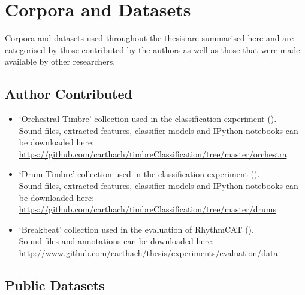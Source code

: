 \section*{Corpora and Datasets}

Corpora and datasets used throughout the thesis are summarised here and are categorised by those contributed by the authors as well as those that were made available by other researchers.

\subsection*{Author Contributed}
\begin{itemize}
	\item `Orchestral Timbre' collection used in the classification experiment (). \\ 
	Sound files, extracted features, classifier models and IPython notebooks can be downloaded here:\\
	\url{https://github.com/carthach/timbreClassification/tree/master/orchestra}
	\item `Drum Timbre' collection used in the classification experiment (). \\ 
	Sound files, extracted features, classifier models and IPython notebooks can be downloaded here:\\
	\url{https://github.com/carthach/timbreClassification/tree/master/drums}	
	\item `Breakbeat' collection used in the evaluation of RhythmCAT ().\\ 
	Sound files and annotations can be downloaded here:\\
	\url{http://www.github.com/carthach/thesis/experiments/evaluation/data}	
\end{itemize}

\subsection*{Public Datasets}

